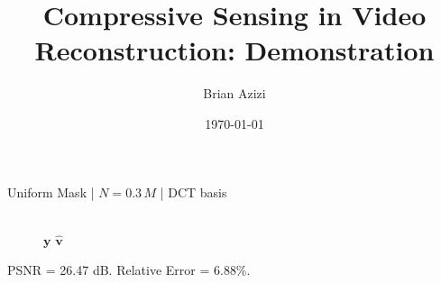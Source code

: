 \documentclass[xcolor=table]{beamer}
\title[Beamer Intro]{Compressive Sensing in Video Reconstruction: Demonstration}
\author{Brian Azizi}
\institute[LSC]{Laboratory for Scientific Computing, University of Cambridge}
\date{\today}
\numberwithin{equation}{section}
\let\bs\boldsymbol
\begin{document}
\begin{frame}
  \titlepage
\end{frame}


\begin{frame}{Uniform Mask | $N = 0.3\,M$ | DCT basis}
  \begin{figure}    
    \,
    \\
    $\bs y$ \hspace{2in} $\hat{\bs v}$
  \end{figure}
PSNR = 26.47 dB. Relative Error = 6.88\%.
\end{frame}
\end{document}
